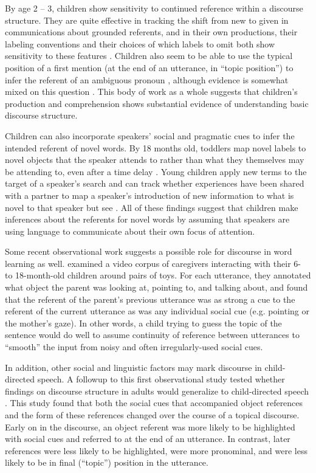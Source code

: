 \documentclass[man]{apa2}
\begin{document}
By age 2 -- 3, children show sensitivity to continued reference within a discourse structure.  They are quite effective in tracking the shift from new to given in communications about grounded referents, and in their own productions, their labeling conventions and their choices of which labels to omit both show sensitivity to these features \cite{allen2000, bates1976, greenfield1976, clancy2004, skarabela2007}.  Children also seem to be able to use the typical position of a first mention (at the end of an utterance, in ``topic position'') to infer the referent of an ambiguous pronoun \cite{song2005, song2007, pyykkonen2010}, although evidence is somewhat mixed on this question \cite{arnold2007}. This body of work as a whole suggests that children's production and comprehension shows substantial evidence of understanding basic discourse structure.

Children can also incorporate speakers' social and pragmatic cues to infer the intended referent of novel words. By 18 months old, toddlers map novel labels to novel objects that the speaker attends to rather than what they themselves may be attending to, even after a time delay \cite{baldwin1991,baldwin1993}.  Young children apply new terms to the target of a speaker's search \cite{tomasello1994} and can track whether experiences have been shared with a partner to map a speaker's introduction of new information to what is novel to that speaker \cite{akhtar1996} but see .  All of these findings suggest that children make inferences about the referents for novel words by assuming that speakers are using language to communicate about their own focus of attention. 


Some recent observational work suggests a possible role for discourse in word learning as well.  examined a video corpus of caregivers interacting with their 6- to 18-month-old children around pairs of toys. For each utterance, they annotated what object the parent was looking at, pointing to, and talking about, and found that the referent of the parent's previous utterance was as strong a cue to the referent of the current utterance as was any individual social cue (e.g. pointing or the mother's gaze). In other words, a child trying to guess the topic of the sentence would do well to assume continuity of reference between utterances to ``smooth'' the input from noisy and often irregularly-used social cues.

In addition, other social and linguistic factors may mark discourse in child-directed speech. A followup to this first observational study tested whether findings on discourse structure in adults would generalize to child-directed speech \cite{rohdeunderreview}. This study found that both the social cues that accompanied object references and the form of these references changed over the course of a topical discourse. Early on in the discourse, an object referent was more likely to be highlighted with social cues and referred to at the end of an utterance. In contrast, later references were less likely to be highlighted, were more pronominal, and were less likely to be in final (``topic'') position in the utterance. 
\end{document}
